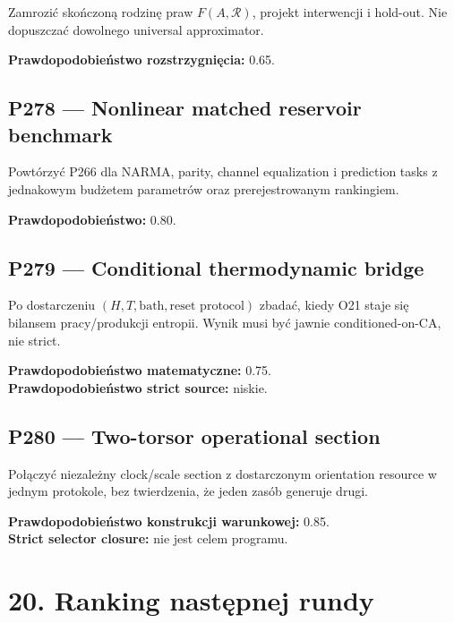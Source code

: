 \documentclass[11pt,a4paper,openany]{report}
\begin{document}
Zamrozić skończoną rodzinę praw \(F(A,\mathcal R)\), projekt interwencji i hold-out. Nie dopuszczać dowolnego universal approximator.

\textbf{Prawdopodobieństwo rozstrzygnięcia:} 0.65.

\section{P278 --- Nonlinear matched reservoir benchmark}

Powtórzyć P266 dla NARMA, parity, channel equalization i prediction tasks z jednakowym bud\.zetem parametrów oraz prerejestrowanym rankingiem.

\textbf{Prawdopodobieństwo:} 0.80.

\section{P279 --- Conditional thermodynamic bridge}

Po dostarczeniu \((H,T,\text{bath},\text{reset protocol})\) zbadać, kiedy O21 staje się bilansem pracy/\allowbreak{}produkcji entropii. Wynik musi być jawnie conditioned-on-CA, nie strict.

\textbf{Prawdopodobieństwo matematyczne:} 0.75.\\
\textbf{Prawdopodobieństwo strict source:} niskie.

\section{P280 --- Two-torsor operational section}

Połączyć niezale\.zny clock/\allowbreak{}scale section z dostarczonym orientation resource w jednym protokole, bez twierdzenia, \.ze jeden zasób generuje drugi.

\textbf{Prawdopodobieństwo konstrukcji warunkowej:} 0.85.\\
\textbf{Strict selector closure:} nie jest celem programu.

\chapter{20. Ranking następnej rundy}
\end{document}
